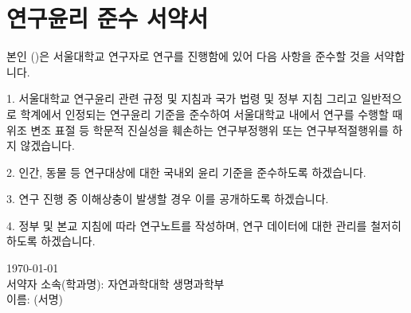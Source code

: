 \chapter*{연구윤리 준수 서약서}
\doublespacing
\makeatletter

본인 (\@author)은 서울대학교 연구자로 연구를 진행함에 있어 다음 사항을 준수할 것을 서약합니다.

1. 서울대학교 연구윤리 관련 규정 및 지침과 국가 법령 및 정부 지침 그리고 일반적으로 학계에서 인정되는 연구윤리 기준을 준수하여 서울대학교 내에서 연구를 수행할 때 위조 변조 표절 등 학문적 진실성을 훼손하는 연구부정행위 또는 연구부적절행위를 하지 않겠습니다.

2. 인간, 동물 등 연구대상에 대한 국내외 윤리 기준을 준수하도록 하겠습니다.

3. 연구 진행 중 이해상충이 발생할 경우 이를 공개하도록 하겠습니다.

4. 정부 및 본교 지침에 따라 연구노트를 작성하며, 연구 데이터에 대한 관리를 철저히 하도록 하겠습니다.

\begin{center}
  \today \\
  서약자 소속(학과명): 자연과학대학 생명과학부 \\
  이름: \quad \@author \quad (서명) \\
\end{center}
\makeatother
